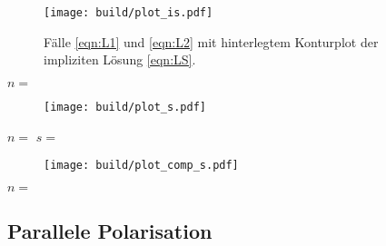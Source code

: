 \begin{figure}[H]
	\texttt{[image: build/plot\_is.pdf]}
	\captionsetup{width=0.95\linewidth}
	\caption{Fälle \eqref{eqn:L1} und \eqref{eqn:L2} mit hinterlegtem Konturplot der impliziten Lösung \eqref{eqn:LS}.}
	\label{fig:plot_is}
\end{figure}

\begin{table}[H]
	\caption{}
	\makebox[\textwidth]{
		\centering
		}
	\label{tab:s}
\end{table}

$n = $

\begin{figure}[H]
	\texttt{[image: build/plot\_s.pdf]}
	\caption{}
	\label{fig:plot_s}
\end{figure}

$n = $ $s = $

\begin{figure}[H]
	\texttt{[image: build/plot\_comp\_s.pdf]}
	\caption{}
	\label{fig:plot_comp_s}
\end{figure}

$n = $

\newpage
\subsection{Parallele Polarisation}

